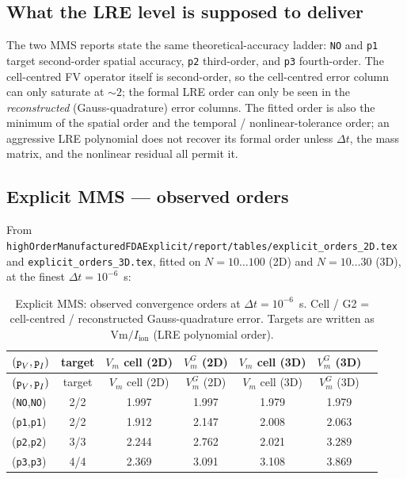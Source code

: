 \documentclass[11pt,a4paper]{article}
\newcommand{\Vm}{V_{m}}
\newcommand{\Iion}{I_{\text{ion}}}
\newcommand{\code}[1]{\texttt{\small #1}}
\begin{document}
\subsection{What the LRE level is supposed to deliver}

The two MMS reports state the same theoretical-accuracy ladder:
\code{NO} and \code{p1} target second-order spatial accuracy,
\code{p2} third-order, and \code{p3} fourth-order. The cell-centred FV
operator itself is second-order, so the cell-centred error column can
only saturate at $\sim 2$; the formal LRE order can only be seen in
the \emph{reconstructed} (Gauss-quadrature) error columns. The fitted
order is also the minimum of the spatial order and the temporal /
nonlinear-tolerance order; an aggressive LRE polynomial does not
recover its formal order unless $\Delta t$, the mass matrix, and the
nonlinear residual all permit it.

\subsection{Explicit MMS --- observed orders}

From
\code{highOrderManufacturedFDAExplicit/report/tables/explicit\_orders\_2D.tex}
and \code{explicit\_orders\_3D.tex}, fitted on $N=10\dots100$ (2D) and
$N=10\dots30$ (3D), at the finest $\Delta t = 10^{-6}$~s:

\begin{center}\footnotesize
\begin{longtable}{lcccccc}
\caption{Explicit MMS: observed convergence orders at
$\Delta t = 10^{-6}$~s. Cell / G2 = cell-centred / reconstructed
Gauss-quadrature error. Targets are written as
$\text{Vm}/\Iion$ (LRE polynomial order).}\\
\toprule
$(\code{p}_V,\code{p}_I)$ & target & $\Vm$ cell (2D) & $\Vm^G$ (2D) & $\Vm$ cell (3D) & $\Vm^G$ (3D) \\
\midrule\endfirsthead\toprule
$(\code{p}_V,\code{p}_I)$ & target & $\Vm$ cell (2D) & $\Vm^G$ (2D) & $\Vm$ cell (3D) & $\Vm^G$ (3D) \\
\midrule\endhead
(\code{NO},\code{NO}) & 2/2 & 1.997 & 1.997 & 1.979 & 1.979 \\
(\code{p1},\code{p1}) & 2/2 & 1.912 & 2.147 & 2.008 & 2.063 \\
(\code{p2},\code{p2}) & 3/3 & 2.244 & 2.762 & 2.021 & 3.289 \\
(\code{p3},\code{p3}) & 4/4 & 2.369 & 3.091 & 3.108 & 3.869 \\
\bottomrule
\end{longtable}\end{center}
\end{document}
